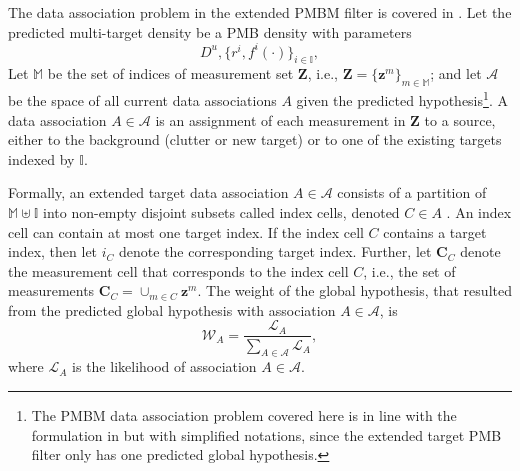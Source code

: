 \documentclass[journal]{IEEEtran}
\begin{document}
The data association problem in the extended PMBM filter is covered in \cite{pmbmextended,pmbmextended2}. Let the predicted multi-target density be a PMB density with parameters
\begin{equation}
D^u, \{r^{i},f^{i}(\cdot)\}_{i\in\mathbb{I}},
\end{equation}
Let $\mathbb{M}$ be the set of indices of measurement set $\mathbf{Z}$, i.e., $\mathbf{Z}=\{\mathbf{z}^m\}_{m\in\mathbb{M}}$; and let $\mathcal{A}$ be the space of all current data associations $A$ given the predicted hypothesis\footnote{The PMBM data association problem covered here is in line with the formulation in \cite{soextended} but with simplified notations, since the extended target PMB filter only has one predicted global hypothesis.}. A data association $A\in\mathcal{A}$ is an assignment of each measurement in $\mathbf{Z}$ to a source, either to the background (clutter or new target) or to one of the existing targets indexed by $\mathbb{I}$. 

Formally, an extended target data association $A\in\mathcal{A}$ consists of a partition of $\mathbb{M} \uplus \mathbb{I}$ into non-empty disjoint subsets called index cells, denoted $C\in A$ \cite{pmbmextended2}. An index cell can contain at most one target index. If the index cell $C$ contains a target index, then let $i_C$ denote the corresponding target index. Further, let $\mathbf{C}_{C}$ denote the measurement cell that corresponds to the index cell $C$, i.e., the set of measurements $\mathbf{C}_C=\cup_{m\in C}\mathbf{z}^m$. The weight of the global hypothesis, that resulted from the predicted global hypothesis with association $A\in\mathcal{A}$, is \cite{pmbmextended2}
\begin{equation}
	\mathcal{W}_{A} = \frac{  \mathcal{L}_{A}}{\sum_{A \in \mathcal{A}} \mathcal{L}_{A}}, \label{eq:UpdatedWeight}
\end{equation}
where $\mathcal{L}_{A}$ is the likelihood of association $A\in\mathcal{A}$.
\end{document}
